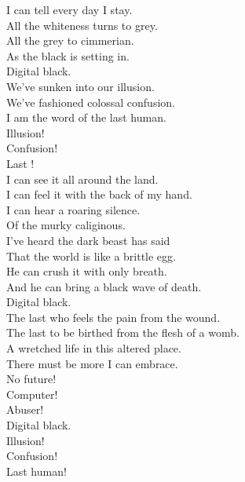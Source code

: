 I can tell every day I stay. \\
All the whiteness turns to grey. \\
All the grey to cimmerian. \\
As the black is setting in. \\

Digital black. \\

We've sunken into our illusion. \\
We've fashioned colossal confusion. \\
I am the word of the last human. \\

Illusion! \\
Confusion! \\
Last ! \\

I can see it all around the land. \\
I can feel it with the back of my hand. \\
I can hear a roaring silence. \\
Of the murky caliginous. \\

I've heard the dark beast has said \\
That the world is like a brittle egg. \\
He can crush it with only breath. \\
And he can bring a black wave of death. \\

Digital black. \\

The last who feels the pain from the wound. \\
The last to be birthed from the flesh of a womb. \\

A wretched life in this altered place. \\
There must be more I can embrace. \\

No future! \\
Computer! \\
Abuser! \\

Digital black. \\

Illusion! \\ 
Confusion! \\
Last human! \\

